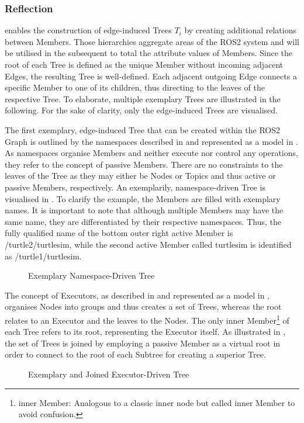     \subsubsection{Reflection}
     enables the construction of edge-induced Trees $T_i$ by creating additional relations between Members. Those hierarchies aggregate areas of the ROS2 system and will be utilised in the subsequent to total the attribute values of Members.
    Since the root of each Tree is defined as the unique Member without incoming adjacent Edges, the resulting Tree is well-defined. Each adjacent outgoing Edge connects a specific Member to one of its children, thus directing to the leaves of the respective Tree. To elaborate, multiple exemplary Trees are illustrated in the following. For the sake of clarity, only the edge-induced Trees are visualised.

    The first exemplary, edge-induced Tree that can be created within the ROS2 Graph is outlined by the namespaces described in  and represented as a model in . As namespaces organise Members and neither execute nor control any operations, they refer to the concept of passive Members. There are no constraints to the leaves of the Tree as they may either be Nodes or Topics and thus active or passive Members, respectively. An exemplarily, namespace-driven Tree is visualised in . To clarify the example, the Members are filled with exemplary names. It is important to note that although multiple Members may have the same name, they are differentiated by their respective namespaces. Thus, the fully qualified name of the bottom outer right active Member is \glqq{}/turtle2/turtlesim\grqq{}, while the second active Member called \glqq{}turtlesim\grqq{} is identified as \glqq{}/turtle1/turtlesim\grqq{}.
    \begin{figure}[h]
        \centering
        
        \caption[Exemplary Namespace-Driven Tree]{Exemplary Namespace-Driven Tree \legend} \label{fig:tikz:mathModel:namespace}
    \end{figure}

    The concept of Executors, as described in  and represented as a model in , organises Nodes into groups and thus creates a set of Trees, whereas the root relates to an Executor and the leaves to the Nodes. The only inner Member\footnote{inner Member: Analogous to a classic \glqq{}inner node\grqq{} but called \glqq{}inner Member\grqq{} to avoid confusion.} of each Tree refers to its root, representing the Executor itself. As illustrated in , the set of Trees is joined by employing a passive Member as a virtual root in order to connect to the root of each Subtree for creating a superior Tree.
    \begin{figure}[h]
        \centering
        
        \caption[Exemplary and Joined Executor-Driven Tree]{Exemplary and Joined Executor-Driven Tree \legend} \label{fig:tikz:mathModel:executors}
    \end{figure}

